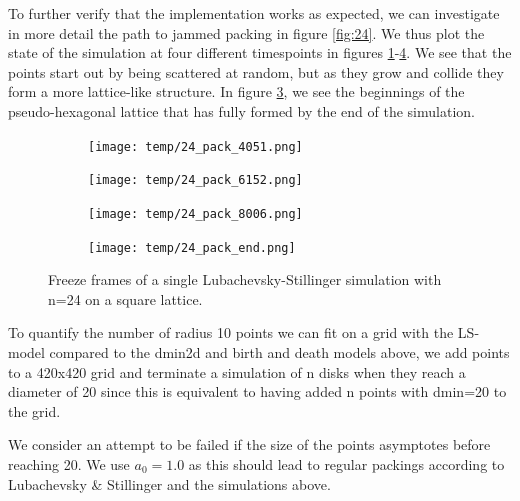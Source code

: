 \documentclass{article}
\begin{document}
To further verify that the implementation works as expected, we can investigate in more detail the path to jammed packing in figure \ref{fig:24}. We thus plot the state of the simulation at four different timespoints in figures \ref{fig:24_1}-\ref{fig:24_4}.
We see that the points start out by being scattered at random, but as they grow and collide they form a more lattice-like structure. In figure \ref{fig:24_3}, we see the beginnings of the pseudo-hexagonal lattice that has fully formed by the end of the simulation.

\begin{figure}[h]
	\centering
	\begin{subfigure}[t]{0.24\linewidth}
		\centering
		\texttt{[image: temp/24\_pack\_4051.png]}
		\label{fig:24_1}	
	\end{subfigure}
	\hspace{0.0005\linewidth}
	\begin{subfigure}[t]{0.24\linewidth}
		\centering
		\texttt{[image: temp/24\_pack\_6152.png]}
		\label{fig:24_2}	
	\end{subfigure}
	\hspace{0.0005\linewidth}
	\begin{subfigure}[t]{0.24\linewidth}
		\centering
		\texttt{[image: temp/24\_pack\_8006.png]}
		\label{fig:24_3}	
	\end{subfigure}
	\hspace{0.0005\linewidth}
	\begin{subfigure}[t]{0.24\linewidth}
		\centering
		\texttt{[image: temp/24\_pack\_end.png]}
		\label{fig:24_4}	
	\end{subfigure}
\label{fig:models}
\caption{Freeze frames of a single Lubachevsky-Stillinger simulation with n=24 on a square lattice.}
\end{figure}

To quantify the number of radius 10 points we can fit on a grid with the LS-model compared to the dmin2d and birth and death models above, we add points to a 420x420 grid and terminate a simulation of n disks when they reach a diameter of 20 since this is equivalent to having added n points with dmin=20 to the grid. 

We consider an attempt to be failed if the size of the points asymptotes before reaching 20. We use $a_0 = 1.0$ as this should lead to regular packings according to Lubachevsky \& Stillinger and the simulations above.
\end{document}
